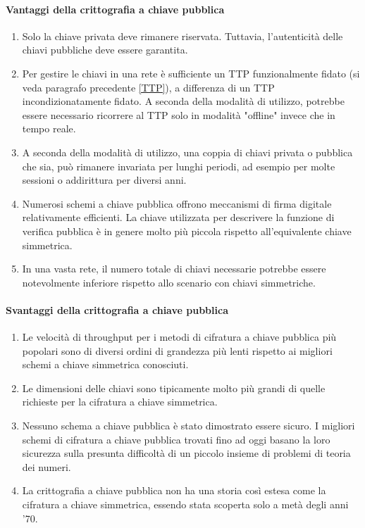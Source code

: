\documentclass{article}
\theoremstyle{definition}
\begin{document}
\paragraph{Vantaggi della crittografia a chiave pubblica}
\begin{enumerate}
    \item Solo la chiave privata deve rimanere riservata. Tuttavia, l'autenticità delle chiavi pubbliche deve essere garantita.
    
    \item Per gestire le chiavi in una rete è sufficiente un TTP funzionalmente fidato (si veda paragrafo precedente \ref{TTP}), a differenza di un TTP incondizionatamente fidato. A seconda della modalità di utilizzo, potrebbe essere necessario ricorrere al TTP solo in modalità "offline" invece che in tempo reale.
    
    \item A seconda della modalità di utilizzo, una coppia di chiavi privata o pubblica che sia, può rimanere invariata per lunghi periodi, ad esempio per molte sessioni o addirittura per diversi anni.
    
    \item Numerosi schemi a chiave pubblica offrono meccanismi di firma digitale relativamente efficienti. La chiave utilizzata per descrivere la funzione di verifica pubblica è in genere molto più piccola rispetto all'equivalente chiave simmetrica.
    
    \item In una vasta rete, il numero totale di chiavi necessarie potrebbe essere notevolmente inferiore rispetto allo scenario con chiavi simmetriche.
\end{enumerate}

\paragraph{Svantaggi della crittografia a chiave pubblica}
\begin{enumerate}
    \item Le velocità di throughput per i metodi di cifratura a chiave pubblica più popolari sono di diversi ordini di grandezza più lenti rispetto ai migliori schemi a chiave simmetrica conosciuti.
    \item Le dimensioni delle chiavi sono tipicamente molto più grandi di quelle richieste per la cifratura a chiave simmetrica.
    \item Nessuno schema a chiave pubblica è stato dimostrato essere sicuro. I migliori schemi di cifratura a chiave pubblica trovati fino ad oggi basano la loro sicurezza sulla presunta difficoltà di un piccolo insieme di problemi di teoria dei numeri.
    \item La crittografia a chiave pubblica non ha una storia così estesa come la cifratura a chiave simmetrica, essendo stata scoperta solo a metà degli anni '70.
\end{enumerate}
\end{document}
